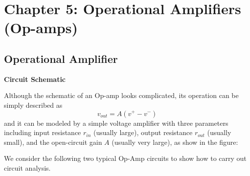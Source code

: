 \usepackage{html}
\textwidth 6.0in
\topmargin -0.5in
\oddsidemargin -0in
\evensidemargin -0.5in


\section*{Chapter 5: Operational Amplifiers (Op-amps)}

\subsection*{Operational Amplifier}

{\bf Circuit Schematic}


Although the schematic of an Op-amp looks complicated, its operation can be
simply described as
\[	v_{out}=A (v^+ - v^-)	\]
and it can be modeled by a simple voltage amplifier with three parameters
including input resistance $r_{in}$ (usually large), output resistance $r_{out}$
(usually small), and the open-circuit gain $A$ (usually very large), as show
in the figure:


We consider the following two typical Op-Amp circuits to show how to carry out
circuit analysis.

